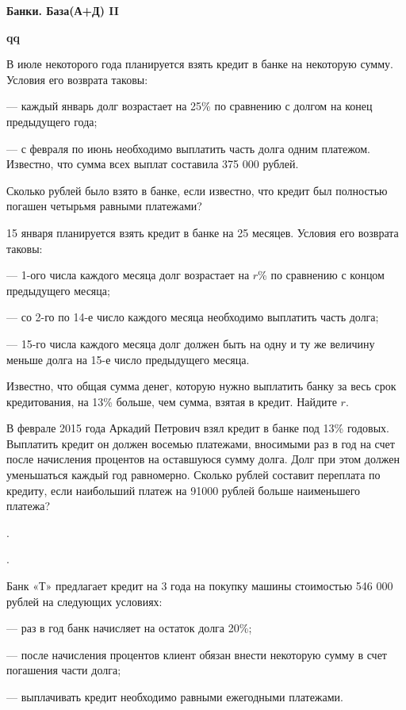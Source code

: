 \centerline{\bf \Huge Банки. База(А+Д) II}
\centerline{\bf \Huge }

\begin{flushright}
        \scriptsize{\textbf{qq}}
\end{flushright}


 В июле некоторого года планируется взять кредит в банке на некоторую сумму. Условия его возврата таковы:

— каждый январь долг возрастает на 25\% по сравнению с долгом на конец предыдущего
года;

— с февраля по июнь необходимо выплатить часть долга одним платежом.
Известно, что сумма всех выплат составила 375 000 рублей. 

Сколько рублей было взято в банке, если известно, что кредит был полностью погашен четырьмя равными платежами?

 15 января планируется взять кредит в банке на 25 месяцев. Условия его возврата таковы:

— 1-ого числа каждого месяца долг возрастает на $r$\% по сравнению с концом предыдущего
месяца;

— со 2-го по 14-е число каждого месяца необходимо выплатить часть долга;

— 15-го числа каждого месяца долг должен быть на одну и ту же величину меньше долга
на 15-е число предыдущего месяца.

Известно, что общая сумма денег, которую нужно выплатить банку за весь срок кредитования, на 13\% больше, чем сумма, взятая в кредит. Найдите $r$.

 В феврале 2015 года Аркадий Петрович взял кредит в банке под 13\% годовых. Выплатить кредит он должен восемью платежами, вносимыми раз в год на счет после начисления процентов на оставшуюся сумму долга. Долг при этом должен уменьшаться каждый год равномерно.
Сколько рублей составит переплата по кредиту, если наибольший платеж на 91000 рублей
больше наименьшего платежа?

.

.

 Банк «Т» предлагает кредит на 3 года на покупку машины стоимостью 546 000
рублей на следующих условиях:

— раз в год банк начисляет на остаток долга 20\%;

— после начисления процентов клиент обязан внести некоторую сумму в счет погашения
части долга;

— выплачивать кредит необходимо равными ежегодными платежами.

